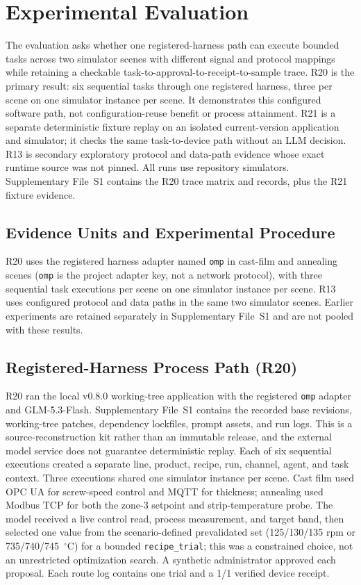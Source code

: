 \section{Experimental Evaluation}
\label{sec:eval}
The evaluation asks whether one registered-harness path can execute bounded
tasks across two simulator scenes with different signal and protocol mappings
while retaining a checkable task-to-approval-to-receipt-to-sample trace. R20 is
the primary result: six sequential tasks through one registered harness, three
per scene on one simulator instance per scene. It demonstrates this configured
software path, not configuration-reuse benefit or process attainment. R21 is a
separate deterministic fixture replay on an isolated current-version
application and simulator; it checks the same task-to-device path without an
LLM decision. R13 is secondary exploratory protocol and data-path evidence
whose exact runtime source was not pinned. All runs use repository simulators.
Supplementary File~S1 contains the R20 trace matrix and records, plus the R21
fixture evidence.

\subsection{Evidence Units and Experimental Procedure}
\label{sec:testbed}
\label{sec:procedure}
R20 uses the registered harness adapter named \texttt{omp} in cast-film and annealing scenes
(\texttt{omp} is the project adapter key, not a network protocol),
with three sequential task executions per scene on one simulator instance per
scene. R13 uses configured protocol and data paths in the same two simulator
scenes. Earlier experiments are retained separately in Supplementary File~S1
and are not pooled with these results.

\subsection{Registered-Harness Process Path (R20)}
\label{sec:harness-e2e}
R20 ran the local v0.8.0 working-tree application with the registered
\texttt{omp} adapter and GLM-5.3-Flash. Supplementary File~S1 contains the
recorded base revisions, working-tree patches, dependency lockfiles, prompt
assets, and run logs. This is a source-reconstruction kit rather than an
immutable release, and the external model service does not guarantee
deterministic replay. Each of six sequential executions created a separate
line, product, recipe, run, channel, agent, and task context. Three executions
shared one simulator instance per scene. Cast film used OPC UA for screw-speed
control and MQTT for thickness; annealing used Modbus TCP for both the zone-3
setpoint and strip-temperature probe. The model received a live control read,
process measurement, and target band, then selected one value from the
scenario-defined prevalidated set (125/130/135 rpm or 735/740/745~$^{\circ}$C)
for a bounded \texttt{recipe\_trial}; this was a constrained choice, not an
unrestricted optimization search. A synthetic administrator approved each
proposal. Each route log contains one trial and a 1/1 verified device receipt.

